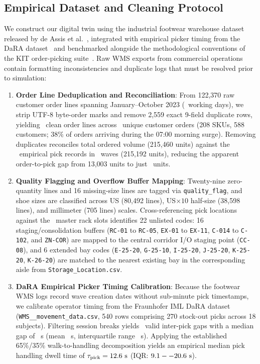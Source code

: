 \documentclass[conference]{IEEEtran}
\begin{document}
\subsection{Empirical Dataset and Cleaning Protocol}
\label{sec:dataset_cleaning}
We construct our digital twin using the industrial footwear warehouse dataset released by de Assis et al.~\cite{assis2025order}, integrated with empirical picker timing from the DaRA dataset~\cite{niemann2026dara} and benchmarked alongside the methodological conventions of the KIT order-picking suite~\cite{barlang2026kit}. Raw WMS exports from commercial operations contain formatting inconsistencies and duplicate logs that must be resolved prior to simulation:
\begin{enumerate}
    \item \textbf{Order Line Deduplication and Reconciliation}: From 122,370 raw customer order lines spanning January--October 2023 (\TotalOperationalDays~working days), we strip UTF-8 byte-order marks and remove 2,559 exact 9-field duplicate rows, yielding \TotalOrderLines~clean order lines across \TotalOrders~unique customer orders (208 SKUs, 588 customers; 38\% of orders arriving during the 07:00 morning surge). Removing duplicates reconciles total ordered volume (215,460 units) against the \TotalPicks~empirical pick records in \TotalWaves~waves (215,192 units), reducing the apparent order-to-pick gap from 13,003 units to just \UnitGapReconciled~units.
    \item \textbf{Quality Flagging and Overflow Buffer Mapping}: Twenty-nine zero-quantity lines and 16 missing-size lines are tagged via \texttt{quality\_flag}, and shoe sizes are classified across US (80,492 lines), US$\times 10$ half-size (38,598 lines), and millimeter (705 lines) scales. Cross-referencing pick locations against the \TotalLocations~master rack slots identifies 22 unlisted codes: 16 staging/consolidation buffers (\texttt{RC-01} to \texttt{RC-05}, \texttt{EX-01} to \texttt{EX-11}, \texttt{C-014} to \texttt{C-102}, and \texttt{ZN-COR}) are mapped to the central corridor I/O staging point (\texttt{CC-08}), and 6 extended bay codes (\texttt{E-25-20}, \texttt{G-25-10}, \texttt{I-25-20}, \texttt{J-25-20}, \texttt{K-25-20}, \texttt{K-26-20}) are matched to the nearest existing bay in the corresponding aisle from \texttt{Storage\_Location.csv}.
    \item \textbf{DaRA Empirical Picker Timing Calibration}: Because the footwear WMS logs record wave creation dates without sub-minute pick timestamps, we calibrate operator timing from the Fraunhofer IML DaRA dataset~\cite{niemann2026dara} (\texttt{WMS\_\_movement\_data.csv}, 540 rows comprising 270 stock-out picks across 18 subjects). Filtering session breaks yields \DaRAValidGaps~valid inter-pick gaps with a median gap of \DaRAMedianGap~s (mean \DaRAMeanGap~s, interquartile range \DaRAIQR~s). Applying the established 65\%/35\% walk-to-handling decomposition yields an empirical median pick handling dwell time of $\tau_{\text{pick}} = 12.6\text{ s}$ (IQR: $9.1--20.6\text{ s}$).
\end{enumerate}
\end{document}
